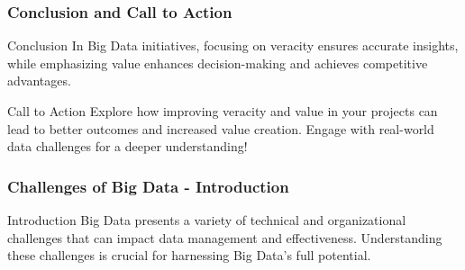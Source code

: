 \documentclass[aspectratio=169]{beamer}
\begin{document}
\begin{frame}[fragile]
    \frametitle{Conclusion and Call to Action}
    \begin{block}{Conclusion}
        In Big Data initiatives, focusing on veracity ensures accurate insights, while emphasizing value enhances decision-making and achieves competitive advantages.
    \end{block}
    
    \begin{block}{Call to Action}
        Explore how improving veracity and value in your projects can lead to better outcomes and increased value creation. Engage with real-world data challenges for a deeper understanding!
    \end{block}
\end{frame}

\begin{frame}[fragile]
    \frametitle{Challenges of Big Data - Introduction}
    \begin{block}{Introduction}
    Big Data presents a variety of technical and organizational challenges that can impact data management and effectiveness. Understanding these challenges is crucial for harnessing Big Data's full potential.
    \end{block}
\end{frame}
\end{document}
